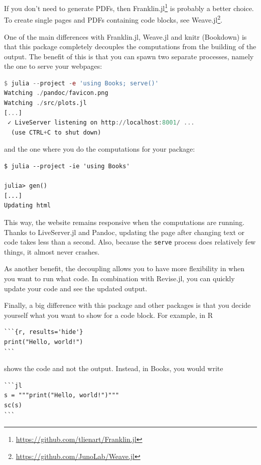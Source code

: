 \documentclass[
  notoc %
]{tufte-book}
\DeclareRobustCommand{\href}[2]{#2\footnote{\url{#1}}}
\newcommand{\passthrough}[1]{#1}
\begin{document}
If you don't need to generate PDFs, then
\href{https://github.com/tlienart/Franklin.jl}{Franklin.jl} is probably
a better choice. To create single pages and PDFs containing code blocks,
see \href{https://github.com/JunoLab/Weave.jl}{Weave.jl}.

One of the main differences with Franklin.jl, Weave.jl and knitr
(Bookdown) is that this package completely decouples the computations
from the building of the output. The benefit of this is that you can
spawn two separate processes, namely the one to serve your webpages:

\begin{lstlisting}[language=Julia]
$ julia --project -e 'using Books; serve()'
Watching ./pandoc/favicon.png
Watching ./src/plots.jl
[...]
 ✓ LiveServer listening on http://localhost:8001/ ...
  (use CTRL+C to shut down)

\end{lstlisting}

and the one where you do the computations for your package:

\begin{lstlisting}
$ julia --project -ie 'using Books'

julia> gen()
[...]
Updating html
\end{lstlisting}

This way, the website remains responsive when the computations are
running. Thanks to LiveServer.jl and Pandoc, updating the page after
changing text or code takes less than a second. Also, because the
\passthrough{\lstinline!serve!} process does relatively few things, it
almost never crashes.

As another benefit, the decoupling allows you to have more flexibility
in when you want to run what code. In combination with Revise.jl, you
can quickly update your code and see the updated output.

Finally, a big difference with this package and other packages is that
you decide yourself what you want to show for a code block. For example,
in R

\begin{lstlisting}
```{r, results='hide'}
print("Hello, world!")
```
\end{lstlisting}

shows the code and not the output. Instead, in Books, you would write

\begin{lstlisting}
```jl
s = """print("Hello, world!")"""
sc(s)
```
\end{lstlisting}
\end{document}
